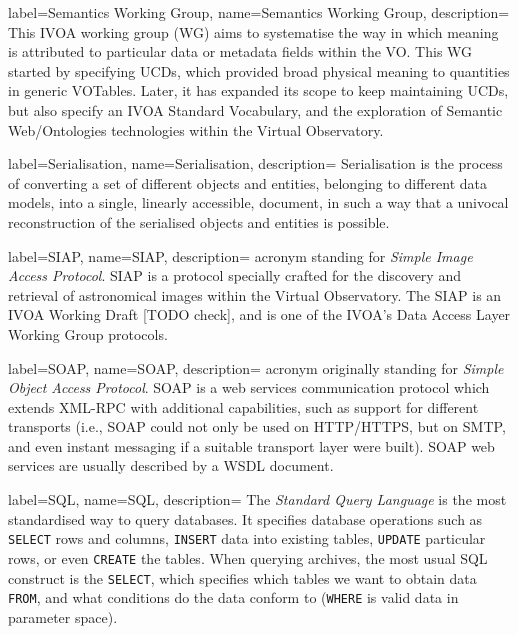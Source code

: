 {
    label={Semantics Working Group},
    name={Semantics Working Group},
    description={
    	This \gls{IVOA} working group (WG) aims to systematise the way
        in which meaning is attributed to particular data or metadata
        fields within the VO. This WG started by specifying \gls{UCD}s,
        which provided broad physical meaning to quantities in generic
        \gls{VOTable}s. Later, it has expanded its scope to keep
        maintaining UCDs, but also specify an IVOA Standard Vocabulary,
        and the exploration of Semantic Web/Ontologies technologies
        within the Virtual Observatory.
    }
}

{
    label={Serialisation},
    name={Serialisation},
    description={
    	Serialisation is the process of converting a set of different
        objects and entities, belonging to different data models, into
        a single, linearly accessible, document, in such a way that a
        univocal reconstruction of the serialised objects and entities
        is possible.
    }
}

{
    label={SIAP},
    name={SIAP},
    description={
    	acronym standing for \emph{Simple Image Access Protocol}. SIAP
        is a protocol specially crafted for the discovery and retrieval
        of astronomical images within the \gls{Virtual Observatory}.
        The SIAP is an \gls{IVOA} \gls{Working Draft} [TODO check], and
        is one of the IVOA's \gls{Data Access Layer} \gls{Working
        Group} protocols.
    }
}

{
    label={SOAP},
    name={SOAP},
    description={
    	acronym originally standing for \emph{Simple Object Access
        Protocol}. SOAP is a web services communication protocol which
        extends \gls{XML-RPC} with additional capabilities, such as
        support for different transports (i.e., SOAP could not only be
        used on \gls{HTTP}/HTTPS, but on \gls{SMTP}, and even instant
        messaging if a suitable transport layer were built). SOAP web
        services are usually described by a \gls{WSDL} document.
    }
}

{
    label={SQL},
    name={SQL},
    description={
    	The \emph{Standard Query Language} is the most standardised way
        to query databases. It specifies database operations such as
        \texttt{SELECT} rows and columns, \texttt{INSERT} data into
        existing tables, \texttt{UPDATE} particular rows, or even
        \texttt{CREATE} the tables. When querying archives, the most
        usual SQL construct is the \texttt{SELECT}, which specifies
        which tables we want to obtain data \texttt{FROM}, and what
        conditions do the data conform to (\texttt{WHERE} is valid data
        in parameter space).
    }
}

